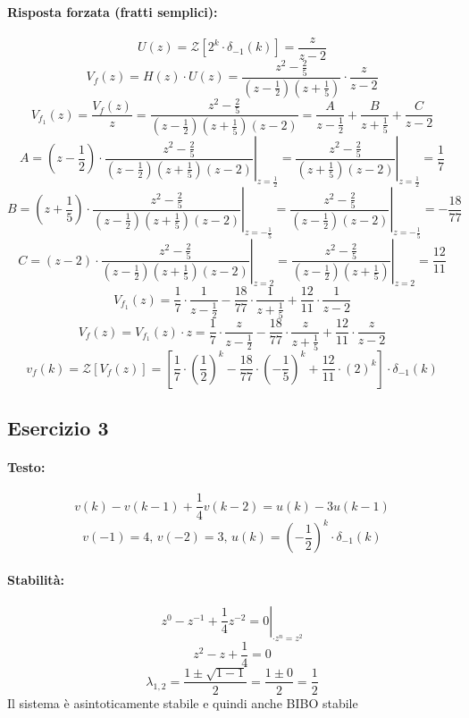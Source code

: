 \documentclass[a4paper,oneside,titlepage]{book}
\begin{document}
\paragraph{Risposta forzata (fratti semplici):}
\[ U(z) = \mathcal{Z} \left[ 2^k \cdot \delta_{-1}(k) \right] = \frac{z}{z-2} \]
\[ V_f(z) = H(z) \cdot U(z) = \frac{z^2 - \frac{2}{5}}{(z - \frac{1}{2})(z + \frac{1}{5})} \cdot \frac{z}{z-2} \]
\[ V_{f_1}(z) = \frac{V_f(z)}{z} = \frac{z^2 - \frac{2}{5}}{(z - \frac{1}{2})(z + \frac{1}{5})(z-2)} = \frac{A}{z - \frac{1}{2}} + \frac{B}{z + \frac{1}{5}} + \frac{C}{z-2} \]
\[
A = \left. \left( z - \frac{1}{2} \right) \cdot \frac{z^2 - \frac{2}{5}}{(z - \frac{1}{2})(z + \frac{1}{5})(z-2)} \right|_{z = \frac{1}{2}} = \left. \frac{z^2 - \frac{2}{5}}{(z + \frac{1}{5})(z-2)} \right|_{z = \frac{1}{2}} = \frac{1}{7}
\]
\[
B = \left. \left( z + \frac{1}{5} \right) \cdot \frac{z^2 - \frac{2}{5}}{(z - \frac{1}{2})(z + \frac{1}{5})(z-2)} \right|_{z = - \frac{1}{5}} = \left. \frac{z^2 - \frac{2}{5}}{(z - \frac{1}{2})(z-2)} \right|_{z = - \frac{1}{5}} = - \frac{18}{77}
\]
\[
C = \left. \left( z - 2 \right) \cdot \frac{z^2 - \frac{2}{5}}{(z - \frac{1}{2})(z + \frac{1}{5})(z-2)} \right|_{z = 2} = \left. \frac{z^2 - \frac{2}{5}}{(z - \frac{1}{2})(z + \frac{1}{5})} \right|_{z = 2} = \frac{12}{11}
\]
\[ V_{f_1}(z) = \frac{1}{7} \cdot \frac{1}{z - \frac{1}{2}} - \frac{18}{77} \cdot \frac{1}{z + \frac{1}{5}} + \frac{12}{11} \cdot \frac{1}{z-2} \]
\[ V_f(z) = V_{f_1}(z) \cdot z = \frac{1}{7} \cdot \frac{z}{z - \frac{1}{2}} - \frac{18}{77} \cdot \frac{z}{z + \frac{1}{5}} + \frac{12}{11} \cdot \frac{z}{z-2} \]
\[
v_f(k) = \mathcal{Z} [V_f(z)] = \left[ \frac{1}{7} \cdot \left( \frac{1}{2} \right)^k - \frac{18}{77} \cdot \left( - \frac{1}{5} \right)^k + \frac{12}{11} \cdot \left( 2 \right)^k \right] \cdot \delta_{-1}(k)
\]


\subsection{Esercizio 3}
\paragraph{Testo:}
\[ v(k) - v(k-1) + \frac{1}{4} v(k-2) = u(k) - 3 u(k-1) \]
\[ v(-1) = 4, \, v(-2) = 3, \, u(k) = \left( -\frac{1}{2} \right)^k \cdot \delta_{-1}(k) \]

\paragraph{Stabilità:}
\[ \left. z^0 - z^{-1} + \frac{1}{4} z^{-2} = 0 \right|_{\cdot z^n = z^2} \]
\[ z^2 - z + \frac{1}{4} = 0 \]
\[ \lambda_{1,2} = \frac{1 \pm \sqrt{1-1}}{2} = \frac{1 \pm 0}{2} = \frac{1}{2} \]
Il sistema è asintoticamente stabile e quindi anche BIBO stabile
\end{document}
